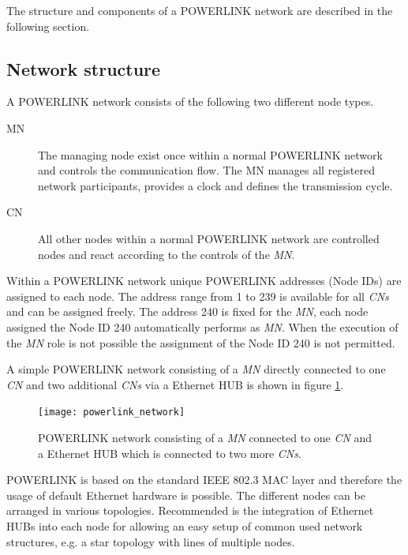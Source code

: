 The structure and components of a POWERLINK network are described in the following section.

\subsection{Network structure}
\label{sec:oplk_powerlink_network}
A POWERLINK network consists of the following two different node types.

\begin{description}
    \item[MN] The managing node exist once within a normal POWERLINK network and controls the communication flow.
    The MN manages all registered network participants, provides a clock and defines the transmission cycle.
    \item[CN] All other nodes within a normal POWERLINK network are controlled nodes and react according to the controls of the \emph{MN}.
\end{description}

Within a POWERLINK network unique POWERLINK addresses (Node IDs) are assigned to each node.
The address range from 1 to 239 is available for all \emph{CNs} and can be assigned freely.
The address 240 is fixed for the \emph{MN}, each node assigned the Node ID 240 automatically performs as \emph{MN}.
When the execution of the \emph{MN} role is not possible the assignment of the Node ID 240 is not permitted.
\cite{epsg_epsg_2013}

A simple POWERLINK network consisting of a \emph{MN} directly connected to one \emph{CN} and two additional \emph{CNs} via a Ethernet HUB is shown in figure \ref{fig:powerlink_network}.

\begin{figure}
    \centering
    \texttt{[image: powerlink\_network]}
    \caption{POWERLINK network consisting of a \emph{MN} connected to one \emph{CN} and a Ethernet HUB which is connected to two more \emph{CNs}.}
    \label{fig:powerlink_network}
\end{figure}

POWERLINK is based on the standard IEEE 802.3 MAC layer and therefore the usage of default Ethernet hardware is possible.
The different nodes can be arranged in various topologies.
Recommended is the integration of Ethernet HUBs into each node for allowing an easy setup of common used network structures, e.g. a star topology with lines of multiple nodes. \cite[chapter 3]{epsg_epsg_2013} %

